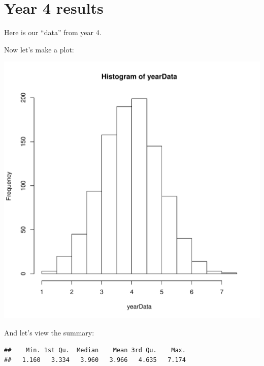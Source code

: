 \section{Year 4 results}
Here is our ``data'' from year 4.
\begin{knitrout}
\color{fgcolor}\begin{kframe}
\begin{alltt}
 \hlkwb{=} \hlstd{(}\hlstd{,}  
\hlopt{::}\hlopt{$}\hlstd{(} \hlstd{=} \hlstd{(}\hlstd{))}
\end{alltt}
\end{kframe}
\end{knitrout}
Now let's make a plot:
\begin{knitrout}
\color{fgcolor}\begin{kframe}
\begin{alltt}
\end{alltt}
\end{kframe}
\includegraphics[width=\maxwidth]{year4/histogram-1} 

\end{knitrout}
And let's view the summary:
\begin{knitrout}
\color{fgcolor}\begin{kframe}
\begin{alltt}
\end{alltt}
\begin{verbatim}
##    Min. 1st Qu.  Median    Mean 3rd Qu.    Max. 
##   1.160   3.334   3.960   3.966   4.635   7.174
\end{verbatim}
\end{kframe}
\end{knitrout}

